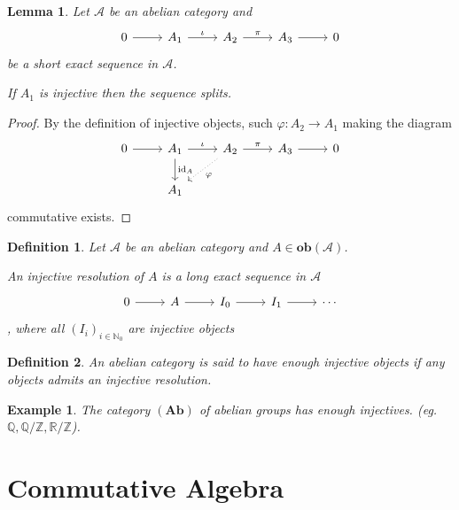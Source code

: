 \documentclass{article}
\newtheorem{definition}{Definition}[section]
\newtheorem{lemma}{Lemma}[section]
\newtheorem{example}{Example}[section]
\numberwithin{equation}{section}
\DeclareMathOperator{\id}{id}
\begin{document}
\begin{lemma}
Let $\mathscr{A}$ be an abelian category and
\[
\begin{tikzcd}
0 \arrow[r] & A_1 \arrow[r,"\iota"] & A_2 \arrow[r,"\pi"] & A_3 \arrow[r] & 0
\end{tikzcd}
\]
be a short exact sequence in $\mathscr{A}$.\\
\par If $A_1$ is injective then the sequence splits.
\end{lemma}

\begin{proof}
By the definition of injective objects, such $\varphi:A_2\to A_1$ making the diagram
\[
\begin{tikzcd}
0 \arrow[r] & A_1 \arrow[d, "\id_A"] \arrow[r, "\iota"] & A_2 \arrow[r, "\pi"] \arrow[ld, "\varphi", dotted] & A_3 \arrow[r] & 0 \\
            & A_1                                       &                                                    &               &  
\end{tikzcd}
\]
commutative exists. 
\end{proof}

\begin{definition}
Let $\mathscr{A}$ be an abelian category and $A\in\mathbf{ob}(\mathscr{A})$.\\
\par An injective resolution of $A$ is a long exact sequence in $\mathscr{A}$
\[
\begin{tikzcd}
0 \arrow[r] & A \arrow[r] & I_0 \arrow[r] & I_1 \arrow[r] & \cdots
\end{tikzcd}
\]
, where all $(I_i)_{i\in\mathbb{N}_0}$ are injective objects
\end{definition}

\begin{definition}
An abelian category is said to have enough injective objects if any objects admits an injective resolution.
\end{definition}

\begin{example}
The category $(\mathbf{Ab})$ of abelian groups has enough injectives. (eg. $\mathbb{Q},\mathbb{Q}/\mathbb{Z},\mathbb{R}/\mathbb{Z}$).
\end{example}

\section{Commutative Algebra}
\end{document}
